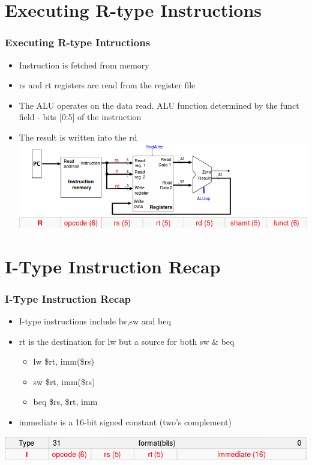 \documentclass{beamer}
\begin{document}
\section{Executing R-type Instructions}
\begin{frame}
\frametitle{Executing R-type Intructions}
\begin{itemize}
\item Instruction is fetched from memory
\item {\color{red}rs} and {\color{red}rt} registers are read from the register file
\item The ALU operates on the data read. ALU function determined by the {\color{blue}funct} field - bits [0:5] of the instruction
\item The result is written into the {\color{red}rd}
\includegraphics[scale=0.4]{rexec.png}
\end{itemize}
\end{frame}
\section{I-Type Instruction Recap}
\begin{frame}
\frametitle{I-Type Instruction Recap}
\begin{itemize}
\item I-type instructions include {\color{blue}lw,sw} and {\color{blue}beq}
\item {\color{red}rt} is the destination for {\color{blue}lw} but a source for both {\color{blue}sw \& beq}
\begin{itemize}
\item {\color{blue}lw \$rt, imm(\$rs)}
\item {\color{blue}sw \$rt, imm(\$rs)}
\item {\color{blue}beq \$rs, \$rt, imm}
\end{itemize}
\item {\color{red}immediate} is a 16-bit signed constant (two's complement)
\end{itemize}
\includegraphics[scale=0.4]{itype.png}
\end{frame}
\end{document}
